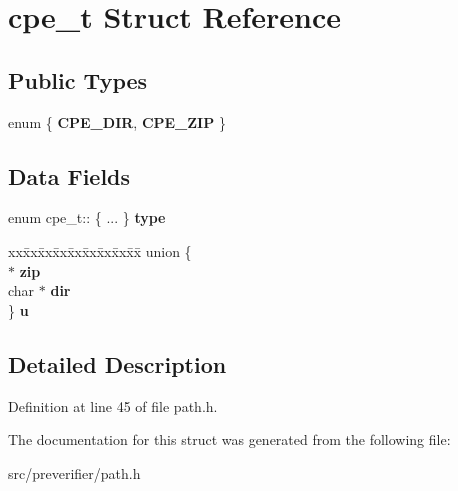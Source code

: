 \section{cpe\_\-t Struct Reference}
\label{structcpe__t}
\subsection*{Public Types}
\begin{DoxyCompactItemize}
\item 
enum \{ {\bfseries CPE\_\-DIR}, 
{\bfseries CPE\_\-ZIP}
 \}
\end{DoxyCompactItemize}
\subsection*{Data Fields}
\begin{DoxyCompactItemize}
\item 
enum cpe\_\-t:: \{ ... \}  {\bfseries type}\label{structcpe__t_a6e17a93a2d9a0bdd5bb28a0662c77b31}

\item 
\begin{tabbing}
xx\=xx\=xx\=xx\=xx\=xx\=xx\=xx\=xx\=\kill
union \{\\
 $\ast$ {\bfseries zip}\\
\>char $\ast$ {\bfseries dir}\\
\} {\bfseries u}\label{structcpe__t_aebb9223a651420352568be989b3b3688}
\\

\end{tabbing}\end{DoxyCompactItemize}


\subsection{Detailed Description}


Definition at line 45 of file path.h.



The documentation for this struct was generated from the following file:\begin{DoxyCompactItemize}
\item 
src/preverifier/path.h\end{DoxyCompactItemize}

